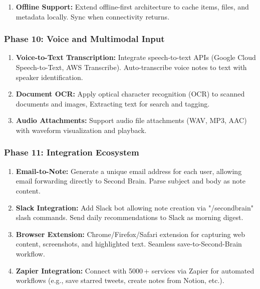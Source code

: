 \documentclass[10pt,twocolumn,a4paper]{article}
\begin{document}
\begin{table}[h]
\begin{enumerate}
\item \textbf{Offline Support:} Extend offline-first architecture to cache items, files, and
  metadata locally. Sync when connectivity returns.

\end{enumerate}

\subsubsection{Phase 10: Voice and Multimodal Input}

\begin{enumerate}

\item \textbf{Voice-to-Text Transcription:} Integrate speech-to-text APIs (Google Cloud
  Speech-to-Text, AWS Transcribe). Auto-transcribe voice notes to text with speaker
  identification.

\item \textbf{Document OCR:} Apply optical character recognition (OCR) to scanned documents
  and images, Extracting text for search and tagging.

\item \textbf{Audio Attachments:} Support audio file attachments (WAV, MP3, AAC) with
  waveform visualization and playback.

\end{enumerate}

\subsubsection{Phase 11: Integration Ecosystem}

\begin{enumerate}

\item \textbf{Email-to-Note:} Generate a unique email address for each user, allowing email
  forwarding directly to Second Brain. Parse subject and body as note content.

\item \textbf{Slack Integration:} Add Slack bot allowing note creation via "/secondbrain" slash
  commands. Send daily recommendations to Slack as morning digest.

\item \textbf{Browser Extension:} Chrome/Firefox/Safari extension for capturing web content,
  screenshots, and highlighted text. Seamless save-to-Second-Brain workflow.

\item \textbf{Zapier Integration:} Connect with 5000\,+ services via Zapier for automated
  workflows (e.g., save starred tweets, create notes from Notion, etc.).


\end{enumerate}
\end{table}
\end{document}
